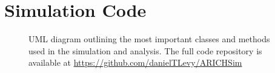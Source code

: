 
\chapter{Simulation Code}
\begin{landscape}   %

\begin{figure}[]
\centering
{}
\caption[UML diagram outlining the most important classes and methods used in the simulation and analysis ]{UML diagram outlining the most important classes and methods used in the simulation and analysis. The full code repository is available at \url{https://github.com/danielTLevy/ARICHSim}
}
\end{figure}
\end{landscape}

